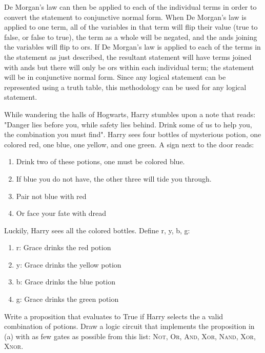\documentclass[solution, letterpaper]{cs20}
\begin{document}
\begin{solution}
De Morgan's law can then be applied to each of the individual terms in order to convert the statement to conjunctive normal form. When De Morgan's law is applied to one term, all of the variables in that term will flip their value (true to false, or false to true), the term as a whole will be negated, and the ands joining the variables will flip to ors. If De Morgan's law is applied to each of the terms in the statement as just described, the resultant statement will have terms joined with ands but there will only be ors within each individual term; the statement will be in conjunctive normal form. Since any logical statement can be represented using a truth table, this methodology can be used for any logical statement. 

\end{solution}



While wandering the halls of Hogwarts, Harry stumbles upon a note that reads: "Danger lies before you, while safety lies behind. Drink some of us to help you, the combination you must find". Harry sees four bottles of mysterious potion, one colored red, one blue, one yellow, and one green. A sign next to the door reads:

\begin{enumerate}
\item Drink two of these potions, one must be colored blue.
\item If blue you do not have, the other three will tide you through.
\item Pair not blue with red
\item Or face your fate with dread
\end{enumerate}

Luckily, Harry sees all the colored bottles. Define r, y, b, g:
\begin{enumerate}
\item r: Grace drinks the red potion
\item y: Grace drinks the yellow potion
\item b: Grace drinks the blue potion
\item g: Grace drinks the green potion
\end{enumerate}

\subproblem Write a proposition that evaluates to True if Harry selects the a valid combination of potions. 
\subproblem Draw a logic circuit that implements the proposition in (a) with as few gates as possible from this list: \textsc{Not}, \textsc{Or}, \textsc{And}, \textsc{Xor}, \textsc{Nand}, \textsc{Xor}, \textsc{Xnor}.
\end{document}
